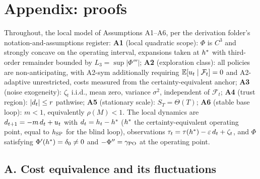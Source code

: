 \documentclass[11pt]{article}
\begin{document}
\section*{Appendix: proofs}


Throughout, the local model of Assumptions A1--A6, per the derivation
folder's notation-and-assumptions register:
\textbf{A1} (local quadratic scope): $\Phi$ is $C^3$ and strongly concave
on the operating interval, expansions taken at $h^{*}$ with third-order
remainder bounded by $L_3 = \sup|\Phi'''|$;
\textbf{A2} (exploration class): all policies are non-anticipating, with
A2-sym additionally requiring $\mathbb{E}[u_t \mid \mathcal{F}_t] = 0$ and
A2-adaptive unrestricted, costs measured from the certainty-equivalent
anchor;
\textbf{A3} (noise exogeneity): $\zeta_t$ i.i.d., mean zero, variance
$\sigma^2$, independent of $\mathcal{F}_t$;
\textbf{A4} (trust region): $|d_t| \le r$ pathwise;
\textbf{A5} (stationary scale): $S_T = \Theta(T)$;
\textbf{A6} (stable base loop): $m < 1$, equivalently $\rho(M) < 1$.
The local dynamics are $d_{t+1} = -m\,d_t + u_t$ with
$d_t = h_t - h^{*}$ ($h^{*}$ the certainty-equivalent operating
point, equal to $h_{\mathrm{SP}}$ for the blind loop), observations
$\tau_t = \tau(h^{*}) - \varepsilon\,d_t + \zeta_t$, and $\Phi$ satisfying
$\Phi'(h^{*}) = \delta_0 \neq 0$ and $-\Phi'' = \gamma_{\mathrm{PO}}$ at the operating
point.

\subsection*{A. Cost equivalence and its fluctuations}
\end{document}
